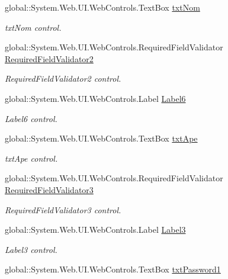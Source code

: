 \begin{DoxyCompactItemize}
global\+::\+System.\+Web.\+U\+I.\+Web\+Controls.\+Text\+Box \mbox{\hyperlink{classwebprueba_1_1_registro_a52e32e3d9dfd1515986fc7a41cab8052}{txt\+Nom}}
\begin{DoxyCompactList}\small\item\em txt\+Nom control. \end{DoxyCompactList}\item 
global\+::\+System.\+Web.\+U\+I.\+Web\+Controls.\+Required\+Field\+Validator \mbox{\hyperlink{classwebprueba_1_1_registro_a68652f63882210b3b2c31892e07e6148}{Required\+Field\+Validator2}}
\begin{DoxyCompactList}\small\item\em Required\+Field\+Validator2 control. \end{DoxyCompactList}\item 
global\+::\+System.\+Web.\+U\+I.\+Web\+Controls.\+Label \mbox{\hyperlink{classwebprueba_1_1_registro_ac533d063bb060371d823963fcb1a1f24}{Label6}}
\begin{DoxyCompactList}\small\item\em Label6 control. \end{DoxyCompactList}\item 
global\+::\+System.\+Web.\+U\+I.\+Web\+Controls.\+Text\+Box \mbox{\hyperlink{classwebprueba_1_1_registro_a557ea2b695ccccea3abad14161dbb1da}{txt\+Ape}}
\begin{DoxyCompactList}\small\item\em txt\+Ape control. \end{DoxyCompactList}\item 
global\+::\+System.\+Web.\+U\+I.\+Web\+Controls.\+Required\+Field\+Validator \mbox{\hyperlink{classwebprueba_1_1_registro_aed53b72bb233e204df669ead11bbc782}{Required\+Field\+Validator3}}
\begin{DoxyCompactList}\small\item\em Required\+Field\+Validator3 control. \end{DoxyCompactList}\item 
global\+::\+System.\+Web.\+U\+I.\+Web\+Controls.\+Label \mbox{\hyperlink{classwebprueba_1_1_registro_a03f09c3a70d4b6d61e6ff24e40f6fb77}{Label3}}
\begin{DoxyCompactList}\small\item\em Label3 control. \end{DoxyCompactList}\item 
global\+::\+System.\+Web.\+U\+I.\+Web\+Controls.\+Text\+Box \mbox{\hyperlink{classwebprueba_1_1_registro_abec622e5e6791f3d28c8d4bae7cc606b}{txt\+Password1}}

\end{DoxyCompactItemize}
